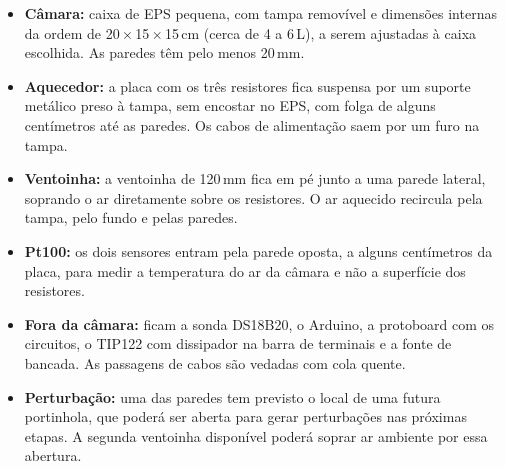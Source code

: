 \documentclass[a4paper,11pt]{article}
\begin{document}
\begin{itemize}
  \item \textbf{Câmara:} caixa de EPS pequena, com tampa removível e dimensões internas da ordem de 20\,$\times$\,15\,$\times$\,15\,cm (cerca de 4 a 6\,L), a serem ajustadas à caixa escolhida. As paredes têm pelo menos 20\,mm.
  \item \textbf{Aquecedor:} a placa com os três resistores fica suspensa por um suporte metálico preso à tampa, sem encostar no EPS, com folga de alguns centímetros até as paredes. Os cabos de alimentação saem por um furo na tampa.
  \item \textbf{Ventoinha:} a ventoinha de 120\,mm fica em pé junto a uma parede lateral, soprando o ar diretamente sobre os resistores. O ar aquecido recircula pela tampa, pelo fundo e pelas paredes.
  \item \textbf{Pt100:} os dois sensores entram pela parede oposta, a alguns centímetros da placa, para medir a temperatura do ar da câmara e não a superfície dos resistores.
  \item \textbf{Fora da câmara:} ficam a sonda DS18B20, o Arduino, a protoboard com os circuitos, o TIP122 com dissipador na barra de terminais e a fonte de bancada. As passagens de cabos são vedadas com cola quente.
  \item \textbf{Perturbação:} uma das paredes tem previsto o local de uma futura portinhola, que poderá ser aberta para gerar perturbações nas próximas etapas. A segunda ventoinha disponível poderá soprar ar ambiente por essa abertura.
\end{itemize}
\end{document}
